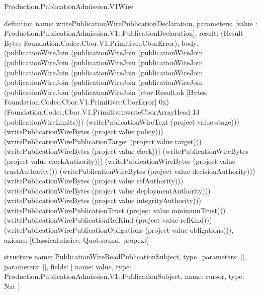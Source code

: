 \begin{lexlean}{Production.PublicationAdmission.V1Wire}
\begin{semanticmodule}
definition{
  name: writePublicationWirePublicationDeclaration,
  parameters: [value : Production.PublicationAdmission.V1::PublicationDeclaration],
  result: (Result Bytes Foundation.Codec.Cbor.V1.Primitive::CborError),
  body: (publicationWireJoin (publicationWireJoin (publicationWireJoin (publicationWireJoin (publicationWireJoin (publicationWireJoin (publicationWireJoin (publicationWireJoin (publicationWireJoin (publicationWireJoin (publicationWireJoin (publicationWireJoin (publicationWireJoin (publicationWireJoin (ctor Result.ok [Bytes, Foundation.Codec.Cbor.V1.Primitive::CborError] 0x) (Foundation.Codec.Cbor.V1.Primitive::writeCborArrayHead 13 (publicationWireLimits))) (writePublicationWireText (project value stage))) (writePublicationWireBytes (project value policy))) (writePublicationWirePublicationTarget (project value target))) (writePublicationWireBytes (project value clock))) (writePublicationWireBytes (project value clockAuthority))) (writePublicationWireBytes (project value trustAuthority))) (writePublicationWireBytes (project value decisionAuthority))) (writePublicationWireBytes (project value refAuthority))) (writePublicationWireBytes (project value deploymentAuthority))) (writePublicationWireBytes (project value integrityAuthority))) (writePublicationWirePublicationTrust (project value minimumTrust))) (writePublicationWirePublicationRefKind (project value refKind))) (writePublicationWirePublicationObligations (project value obligations))),
  axioms: [Classical.choice, Quot.sound, propext]
}

structure{
  name: PublicationWireReadPublicationSubject,
  type_parameters: [],
  parameters: [],
  fields: [
    {name: value, type: Production.PublicationAdmission.V1::PublicationSubject},
    {name: cursor, type: Nat}
  ]
}


\end{semanticmodule}
\end{lexlean}
